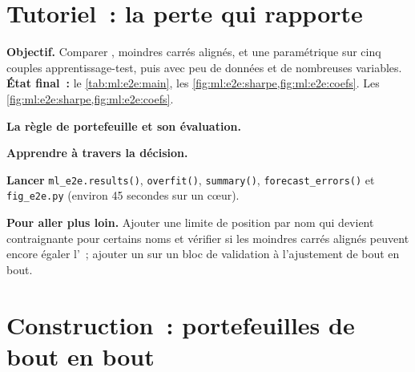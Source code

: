 \section{Tutoriel~: la perte qui rapporte}\label{tut:ml:from-prediction-to-portfolio:tut}

\begin{tutorial}
\textbf{Objectif.} Comparer , moindres carrés alignés,  et une  paramétrique sur cinq
couples apprentissage-test, puis avec peu de données et de nombreuses variables. \textbf{État final~:} le \cref{tab:ml:e2e:main}, les \cref{fig:ml:e2e:sharpe,fig:ml:e2e:coefs}.
Les \cref{fig:ml:e2e:sharpe,fig:ml:e2e:coefs}.
\begin{tutsteps}
\item \textbf{La règle de portefeuille et son évaluation.}
\label{lst:ml:e2e:run}
\item \textbf{Apprendre à travers la décision.}
\label{lst:ml:e2e:train}
\item \textbf{Lancer} \texttt{ml\_e2e.results()}, \texttt{overfit()}, \texttt{summary()}, \texttt{forecast\_errors()} et
\texttt{fig\_e2e.py} (environ 45 secondes sur un cœur).
\end{tutsteps}
\textbf{Pour aller plus loin.} Ajouter une limite de position par nom qui devient contraignante pour certains noms et vérifier si les moindres carrés alignés
peuvent encore égaler l'~; ajouter un  sur un bloc de validation à l'ajustement de bout en bout.
\end{tutorial}

\section{Construction~: portefeuilles de bout en bout}\label{bld:ml:from-prediction-to-portfolio:e2eport}


